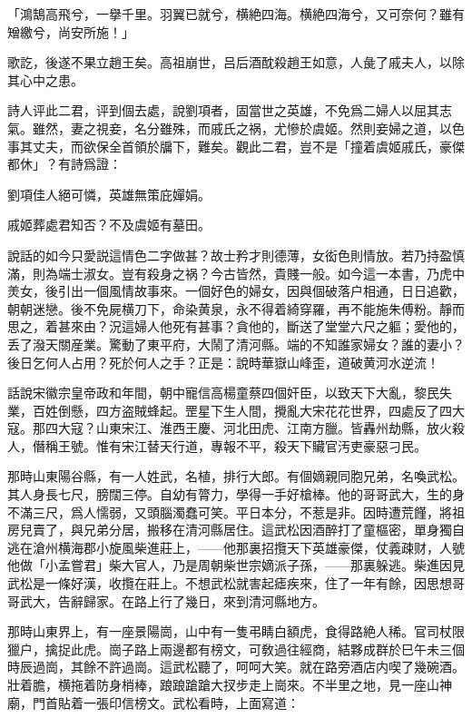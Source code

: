 \begin{myquote}
「鴻鵠高飛兮，一擧千里。羽翼已就兮，横絶四海。横絶四海兮，又可奈何？雖有矰繳兮，尚安所施！」
\end{myquote}

歌訖，後遂不果立趙王矣。高祖崩世，吕后酒酖殺趙王如意，人彘了戚夫人，以除其心中之患。

詩人评此二君，评到個去處，說劉項者，固當世之英雄，不免爲二婦人以屈其志氣。雖然，妻之視妾，名分雖殊，而戚氏之祸，尤慘於虞姬。然則妾婦之道，以色事其丈夫，而欲保全首領於牖下，難矣。觀此二君，豈不是「撞着虞姬戚氏，豪傑都休」？有詩爲證：

\begin{myquote}
劉項佳人絕可憐，英雄無策庇嬋娟。

戚姬葬處君知否？不及虞姬有墓田。
\end{myquote}

說話的如今只愛説這情色二字做甚？故士矜才則德薄，女衒色則情放。若乃持盈慎滿，則為端士淑女。豈有殺身之祸？今古皆然，貴賤一般。如今這一本書，乃虎中羙女，後引出一個風情故事來。一個好色的婦女，因與個破落户相通，日日追歡，朝朝迷戀。後不免屍横刀下，命染黄泉，永不得着綺穿羅，再不能施朱傅粉。靜而思之，着甚來由？況這婦人他死有甚事？貪他的，斷送了堂堂六尺之軀；愛他的，丢了潑天關産業。驚動了東平府，大鬧了清河縣。端的不知誰家婦女？誰的妻小？後日乞何人占用？死於何人之手？正是：說時華嶽山峰歪，道破黄河水逆流！

話說宋徽宗皇帝政和年間，朝中寵信高楊童蔡四個奸臣，以致天下大亂，黎民失業，百姓倒懸，四方盗賊蜂起。罡星下生人間，攪亂大宋花花世界，四處反了四大寇。那四大寇？山東宋江、淮西王慶、河北田虎、江南方臘。皆轟州劫縣，放火殺人，僭稱王號。惟有宋江替天行道，專報不平，殺天下贜官汚吏豪惡刁民。

那時山東陽谷縣，有一人姓武，名植，排行大郎。有個嫡親同胞兄弟，名喚武松。其人身長七尺，膀闊三停。自幼有膂力，學得一手好槍棒。他的哥哥武大，生的身不滿三尺，爲人懦弱，又頭腦濁蠢可笑。平日本分，不惹是非。因時遭荒饉，將祖房兒賣了，與兄弟分居，搬移在清河縣居住。這武松因酒醉打了童樞密，單身獨自逃在滄州横海郡小旋風柴進莊上，——他那裏招攬天下英雄豪傑，仗義疎财，人號他做「小孟嘗君」柴大官人，乃是周朝柴世宗嫡派子孫，——那裏躲逃。柴進因見武松是一條好漢，收攬在莊上。不想武松就害起瘧疾來，住了一年有餘，因思想哥哥武大，告辭歸家。在路上行了幾日，來到清河縣地方。

那時山東界上，有一座景陽崗，山中有一隻弔睛白額虎，食得路絶人稀。官司杖限獵户，擒捉此虎。崗子路上兩邊都有榜文，可敎過往經商，結夥成群於巳午未三個時辰過崗，其餘不許過崗。這武松聽了，呵呵大笑。就在路旁酒店内喫了幾碗酒。壯着膽，横拖着防身梢棒，踉踉蹌蹌大扠步走上崗來。不半里之地，見一座山神廟，門首貼着一張印信榜文。武松看時，上面寫道：

